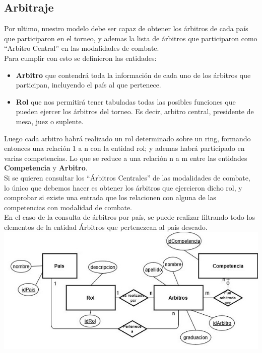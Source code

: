 \subsection{Arbitraje}

Por ultimo, nuestro modelo debe ser capaz de obtener los árbitros de cada país que participaron en el torneo, y ademas la lista de árbitros que participaron como ``Arbitro Central'' en las modalidades de combate.\\

Para cumplir con esto se definieron las entidades: 
\begin{itemize}
\item \textbf{Arbitro} que contendrá toda la información de cada uno de los árbitros que participan, incluyendo el país al que pertenece.
\item \textbf{Rol} que nos permitirá tener tabuladas todas las posibles funciones que pueden ejercer los árbitros del torneo. Es decir, arbitro central, presidente de mesa, juez o suplente.
\end{itemize}
Luego cada arbitro habrá realizado un rol determinado sobre un ring, formando entonces una relación 1 a n con la entidad rol; y ademas habr\'a participado en varias competencias. Lo que se reduce a una relación n a m entre las entidades \textbf{Competencia} y \textbf{Arbitro}.\\

Si se quieren consultar los ``Árbitros Centrales'' de las modalidades de combate, lo único que debemos hacer es obtener los árbitros que ejercieron dicho rol, y comprobar si existe una entrada que los relacionen con alguna de las competencias con modalidad de combate.\\

En el caso de la consulta de árbitros por país, se puede realizar filtrando todo los elementos de la entidad Árbitros que pertenezcan al país deseado. \\

\includegraphics[scale=0.75]{arbitroDiag.jpg}

